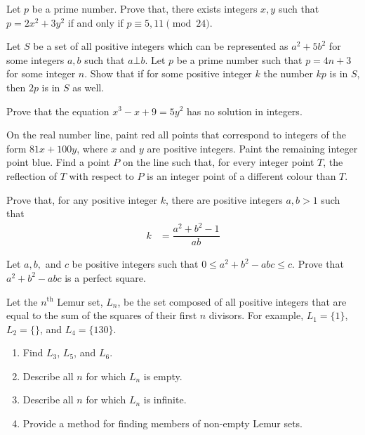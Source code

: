 \documentclass[problems.tex]{subfile}
\begin{document}
	\begin{problem}
		Let $p$ be a prime number. Prove that, there exists integers $x,y$ such that $p=2x^2+3y^2$ if and only if $p\equiv5,11\pmod{24}$.
	\end{problem}
	
	\begin{problem}
		Let $S$ be a set of all positive integers which can be represented as $ a^2 + 5b^2$ for some integers $ a,b$ such that $ a\bot b$. Let $p$ be a prime number such that $ p = 4n + 3$ for some integer $ n$. Show that if for some positive integer $ k$ the number $ kp$ is in $S$, then $2p$ is in $ S$ as well.
	\end{problem}
	
	\begin{problem}
		Prove that the equation $x^3-x+9=5y^2$ has no solution in integers.
	\end{problem}
	
	\begin{problem}
		On the real number line, paint red all points that correspond to integers of the form $81x+100y$, where $x$ and $y$ are positive integers. Paint the remaining integer point blue. Find a point $P$ on the line such that, for every integer point $T$, the reflection of $T$ with respect to $P$ is an integer point of a different colour than $T$.
	\end{problem}
	
	\begin{problem}
		Prove that, for any positive integer $k$, there are positive integers $a,b>1$ such that
		\begin{align*}
		k  & = \dfrac{a^2+b^2-1}{ab}
		\end{align*}
	\end{problem}
	
	\begin{problem}
		Let $a, b,$ and $c$ be positive integers such that $0 \leq a^2+b^2-abc \leq c$. Prove that $a^2+b^2-abc$ is a perfect square.
	\end{problem}
	
	\begin{problem}
		Let the $ n^{\text{th}}$ Lemur set, $ L_n$, be the set composed of all positive integers that are equal to the sum of the squares of their first $ n$ divisors. For example, $ L_1 = \{1\}$, $ L_2 = \{\}$, and $ L_4 = \{130\}$.
			\begin{enumerate}[a]
				\item Find $ L_3$, $ L_5$, and $ L_6$.
				\item Describe all $ n$ for which $ L_n$ is empty.
				\item Describe all $ n$ for which $ L_n$ is infinite.
				\item Provide a method for finding members of non-empty Lemur sets.
			\end{enumerate}
	\end{problem}
	
\end{document}
